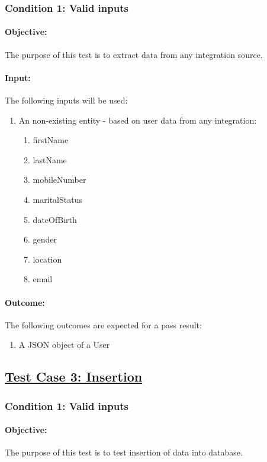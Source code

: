 \documentclass{article}
\begin{document}
\subsubsection{Condition 1: Valid inputs }
\paragraph{Objective:} The purpose of this test is to extract data from any integration source.
\paragraph{Input:} The following inputs will be used:
\begin{enumerate}
	\item An non-existing entity - based on user data from any integration:
	\begin{enumerate}
		\item firstName
  		\item lastName
  		\item mobileNumber 
  		\item maritalStatus 
  		\item dateOfBirth 
 		\item gender
  		\item location 
 		\item email	
	\end{enumerate}
\end{enumerate}
\paragraph{Outcome:} The following outcomes are expected for a pass result:
\begin{enumerate}
	\item A JSON object of a User 
\end{enumerate}

\subsection{\underline{Test Case 3: Insertion}}\label{test3}
\subsubsection{Condition 1: Valid inputs }
\paragraph{Objective:} The purpose of this test is to test insertion of data into database.
\end{document}
